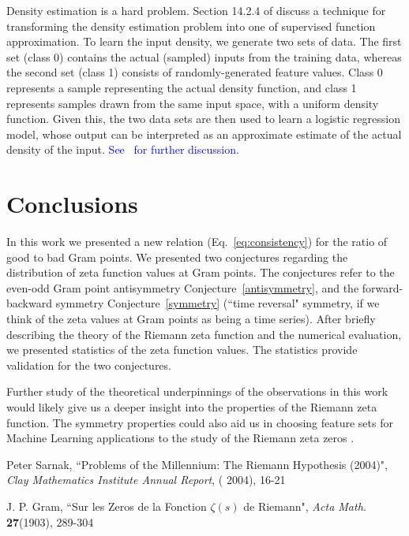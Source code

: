 \documentclass[twoside]{article}
\theoremstyle{definition}
\begin{document}
{Density estimation is a hard problem. Section 14.2.4 of \cite{Friedman(2001)}  discuss a technique for transforming the density estimation problem into one of supervised function approximation. To learn the input density, we generate two sets of data. The first set (class 0) contains the actual (sampled) inputs from the training data, whereas the second set (class 1) consists of randomly-generated feature values. Class 0 represents a sample representing the actual density function, and class 1 represents samples drawn from the same input space, with a uniform density function. Given this, the two data sets are then used to learn a logistic regression model, whose output can be interpreted as an approximate estimate of the actual density of the input. \textcolor{blue}{See~\cite{Friedman(2001)} for further discussion. }     

\section{\label{conclusions}Conclusions}

In this work we presented a new  relation (Eq.~\ref{eq:consistency}) for the ratio of good to bad Gram points. We presented two conjectures regarding the distribution of zeta function values at Gram points. The conjectures refer to the even-odd Gram point antisymmetry Conjecture~\ref{antisymmetry}, and the forward-backward symmetry Conjecture~\ref{symmetry} (``time reversal" symmetry, if we think of the zeta values at Gram points as being a time series). After briefly describing the theory of the Riemann zeta function and the numerical evaluation, we presented statistics of the zeta function values. The statistics provide validation for the two conjectures.

Further study of the theoretical underpinnings of the observations in this work would likely give us a deeper insight into the properties of the Riemann zeta function. The symmetry properties could also aid us in choosing feature sets for Machine Learning applications to the study of the Riemann zeta zeros \cite{osneural,osentropy}.

\begin{thebibliography} {}

 Peter Sarnak,
``Problems of the Millennium: The Riemann Hypothesis (2004)",  {\it Clay Mathematics Institute Annual Report}, ( 2004), 
16-21

 J. P. Gram, 
``Sur les Zeros de la Fonction  $\zeta ( s )$  de Riemann",
{\it Acta Math.} {\bf27}(1903), 289-304


\end{thebibliography}}
\end{document}
